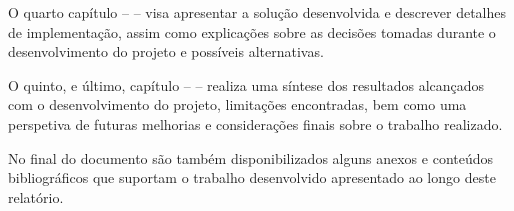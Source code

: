 O quarto capítulo –  – visa apresentar a solução desenvolvida e 
descrever detalhes de implementação, assim como explicações sobre as decisões tomadas durante o
desenvolvimento do projeto e possíveis alternativas.

O quinto, e último, capítulo –  – realiza uma síntese dos resultados 
alcançados com o desenvolvimento do projeto, limitações encontradas, bem como uma perspetiva de 
futuras melhorias e considerações finais sobre o trabalho realizado.

No final do documento são também disponibilizados alguns anexos e conteúdos bibliográficos que 
suportam o trabalho desenvolvido apresentado ao longo deste relatório.
